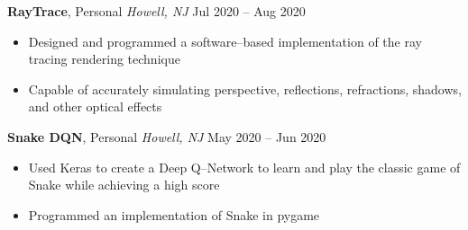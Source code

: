 \documentclass[10pt,letterpaper,roman]{moderncv}
\begin{document}
\hfill

\textbf{RayTrace}, Personal \textit{Howell, NJ} \hfill Jul 2020 -- Aug 2020
\begin{itemize}
	\item Designed and programmed a software--based implementation of the ray tracing rendering technique
	\item Capable of accurately simulating perspective, reflections, refractions, shadows, and other optical effects
\end{itemize}

\hfill

\textbf{Snake DQN}, Personal \textit{Howell, NJ} \hfill May 2020 -- Jun 2020
\begin{itemize}
	\item Used Keras to create a Deep Q--Network to learn and play the classic game of Snake while achieving a high score
	\item Programmed an implementation of Snake in pygame
\end{itemize}
\end{document}
